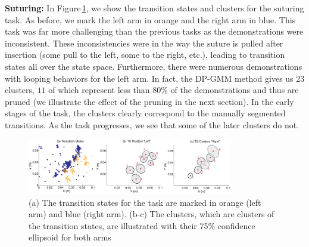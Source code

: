 \noindent\textbf{Suturing: }
In Figure\,\ref{exp:su}, we show the transition states and clusters for the suturing task.
As before, we mark the left arm in orange and the right arm in blue.
This task was far more challenging than the previous tasks as the demonstrations were inconsistent.
These inconsistencies were in the way the suture is pulled after insertion (some pull to the left, some to the right, etc.), leading to transition states all over the state space. 
Furthermore, there were numerous demonstrations with looping behaviors for the left arm.
In fact, the DP-GMM method gives us $23$ clusters, $11$ of which represent less than $80$\% of the demonstrations and thus are pruned (we illustrate the effect of the pruning in the next section).
In the early stages of the task, the clusters clearly correspond to the manually segmented transitions.
As the task progresses, we see that some of the later clusters do not.


\begin{figure}[ht!t]
\centering
    \includegraphics[width=0.8\textwidth]{tsc-experiments/new_suturing2.eps}
    \vspace{-0.7em}
    \caption{ (a) The transition states for the task are marked in orange (left arm) and blue (right arm). (b-c) The clusters, which are clusters of the transition states, are illustrated with their 75\% confidence ellipsoid for both arms}
    \label{exp:su}
\end{figure}


